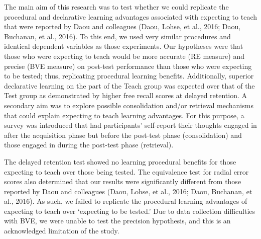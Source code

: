 \documentclass[
  english,
  man,floatsintext]{apa7}
\begin{document}
The main aim of this research was to test whether we could replicate the procedural and declarative learning advantages associated with expecting to teach that were reported by Daou and colleagues (Daou, Lohse, et al., 2016; Daou, Buchanan, et al., 2016). To this end, we used very similar procedures and identical dependent variables as those experiments. Our hypotheses were that those who were expecting to teach would be more accurate (RE measure) and precise (BVE measure) on post-test performance than those who were expecting to be tested; thus, replicating procedural learning benefits. Additionally, superior declarative learning on the part of the Teach group was expected over that of the Test group as demonstrated by higher free recall scores at delayed retention. A secondary aim was to explore possible consolidation and/or retrieval mechanisms that could explain expecting to teach learning advantages. For this purpose, a survey was introduced that had participants' self-report their thoughts engaged in after the acquisition phase but before the post-test phase (consolidation) and those engaged in during the post-test phase (retrieval).

The delayed retention test showed no learning procedural benefits for those expecting to teach over those being tested. The equivalence test for radial error scores also determined that our results were significantly different from those reported by Daou and colleagues (Daou, Lohse, et al., 2016; Daou, Buchanan, et al., 2016). As such, we failed to replicate the procedural learning advantages of expecting to teach over `expecting to be tested.' Due to data collection difficulties with BVE, we were unable to test the precision hypothesis, and this is an acknowledged limitation of the study.
\end{document}

